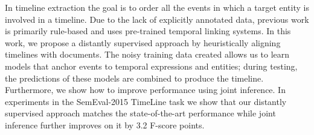 In timeline extraction the goal is to order all the events in which a target entity is involved in a timeline. Due to the lack of explicitly annotated data, previous work is primarily rule-based and uses pre-trained temporal linking systems. In this work, we propose a distantly supervised approach by heuristically aligning timelines with documents. The noisy training data created allows us to learn models that anchor events to temporal expressions and entities; during testing, the predictions of these models are combined to produce the timeline. Furthermore, we show how to improve performance using joint inference. In experiments in the SemEval-2015 TimeLine task we show that our distantly supervised approach matches the state-of-the-art performance while joint inference further improves on it by 3.2 F-score points.
